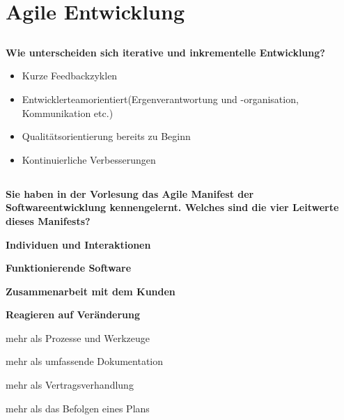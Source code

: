 \section{Agile Entwicklung}
\subsection{}
\textbf{Wie unterscheiden sich iterative und inkrementelle Entwicklung?}
\begin{itemize}
    \item Kurze Feedbackzyklen
    \item Entwicklerteamorientiert(Ergenverantwortung und -organisation, Kommunikation etc.)
    \item Qualitätsorientierung bereits zu Beginn
    \item Kontinuierliche Verbesserungen
\end{itemize}

\subsection{}
\textbf{Sie haben in der Vorlesung das Agile Manifest der Softwareentwicklung kennengelernt. Welches sind die vier Leitwerte dieses Manifests?}

\begin{center}
    \begin{minipage}{.48\linewidth}
        \begin{flushright}
            \textbf{Individuen und Interaktionen}

            \textbf{Funktionierende Software}

            \textbf{Zusammenarbeit mit dem Kunden}

            \textbf{Reagieren auf Veränderung}
        \end{flushright}
    \end{minipage}
    \begin{minipage}{.48\linewidth}
        \begin{flushleft}
            mehr als Prozesse und Werkzeuge

            mehr als umfassende Dokumentation

            mehr als Vertragsverhandlung

            mehr als das Befolgen eines Plans
        \end{flushleft}
    \end{minipage}
\end{center}


